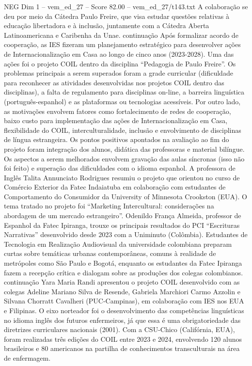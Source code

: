 \begin{textsample}{NEG Dim 1 – vem\_ed\_27 – Score 82.00 – vem\_ed\_27/t143.txt}
A colaboração se deu por meio da Cátedra Paulo Freire, que visa estudar questões relativas à educação libertadora e à inclusão, juntamente com a Cátedra Aberta Latinoamericana e Caribenha da Unae. continuação Após formalizar acordo de cooperação, as IES fizeram um planejamento estratégico para desenvolver ações de Internacionalização em Casa ao longo de cinco anos (2023-2028).
Uma das ações foi o projeto COIL dentro da disciplina “Pedagogia de Paulo Freire”.
Os problemas principais a serem superados foram a grade curricular (dificuldade para reconhecer as atividades desenvolvidas nos projetos COIL dentro das disciplinas), a falta de regulamento para disciplinas on-line, a barreira linguística (português-espanhol) e as plataformas ou tecnologias acessíveis.
Por outro lado, as motivações envolvem fatores como fortalecimento de redes de cooperação, baixo custo para implementação das ações de Internacionalização em Casa, flexibilidade do COIL, interculturalidade, inclusão e envolvimento de disciplinas de língua estrangeira.
Os pontos positivos apontados na avaliação ao fim do projeto foram integração dos alunos, didática das professoras e material bilíngue.
Os aspectos a serem melhorados envolvem gravação das aulas síncronas (isso não foi feito) e superação das dificuldades com o idioma espanhol.
A professora de Inglês Talita Annunciato Rodrigues resumiu o projeto que orientou no curso de Comércio Exterior da Fatec Indaiatuba em colaboração com estudantes de Comportamento do Consumidor da University of Minnesota Crookston (EUA).
O tema tratado no projeto foi “Marketing Intercultural: considerações na abordagem de um mercado estrangeiro”.
Odenildo França Almeida, professor de Espanhol da Fatec Ipiranga, trouxe os principais resultados do PCI “Escrituras Narrativas” desenvolvido desde 2023 com a Uniminuto (Colômbia).
Estudantes de Tecnologia em Realização Audiovisual da universidade colombiana preparam curtas sobre temáticas urbanas contemporâneas, comuns à realidade de metrópoles como São Paulo e Bogotá, enquanto os estudantes da Fatec Ipiranga fazem a recepção crítica e dialogam sobre as produções dos colegas colombianos. continuação Yara Maria Randi apresentou o projeto COIL desenvolvido com as colegas Adeline Mariano Silva de Resende, Gabriela Marchiori Carmo Azzolin e Silvana Chorratt Cavalheri (PUC-Campinas), em colaboração com IES nos EUA e Filipinas.
O eixo norteador foi o desenvolvimento das competências linguísticas no idioma inglês dos futuros enfermeiros, já que essa é uma obrigatoriedade das diretrizes curriculares nacionais (2001).
Com a CSU-Chico (Califórnia, EUA), foram realizadas três edições do COIL entre 2023 e 2024, envolvendo 120 alunos brasileiros e 80 americanos na partilha de conhecimentos transculturais na área de enfermagem.

\end{textsample}
